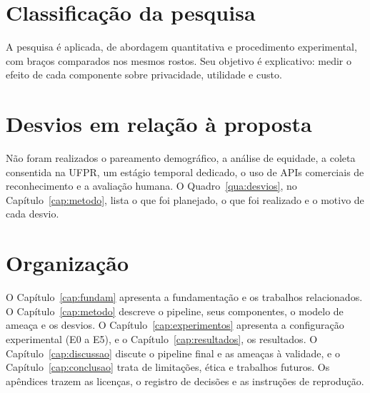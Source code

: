 \section{Classificação da pesquisa}

A pesquisa é aplicada, de abordagem quantitativa e procedimento experimental, com braços comparados nos mesmos rostos. Seu objetivo é explicativo: medir o efeito de cada componente sobre privacidade, utilidade e custo.

\section{Desvios em relação à proposta}

Não foram realizados o pareamento demográfico, a análise de equidade, a coleta consentida na UFPR, um estágio temporal dedicado, o uso de APIs comerciais de reconhecimento e a avaliação humana. O Quadro~\ref{qua:desvios}, no Capítulo~\ref{cap:metodo}, lista o que foi planejado, o que foi realizado e o motivo de cada desvio.

\section{Organização}

O Capítulo~\ref{cap:fundam} apresenta a fundamentação e os trabalhos relacionados. O Capítulo~\ref{cap:metodo} descreve o pipeline, seus componentes, o modelo de ameaça e os desvios. O Capítulo~\ref{cap:experimentos} apresenta a configuração experimental (E0 a E5), e o Capítulo~\ref{cap:resultados}, os resultados. O Capítulo~\ref{cap:discussao} discute o pipeline final e as ameaças à validade, e o Capítulo~\ref{cap:conclusao} trata de limitações, ética e trabalhos futuros. Os apêndices trazem as licenças, o registro de decisões e as instruções de reprodução.
